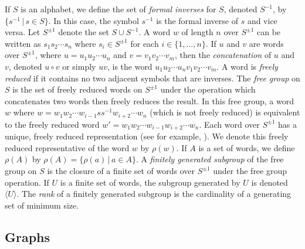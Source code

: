 \documentclass{elsarticlenonatbib}
\newcommand{\gen}[1]{\langle #1 \rangle}
\newcommand{\Spm}{S^{\pm1}}
\begin{document}
If $S$ is an alphabet, we define the set of \emph{formal inverses} for $S$, denoted $S^{-1}$, by $\{ s^{-1} \,|\, s \in S \}$.
In this case, the symbol $s^{-1}$ is the formal inverse of $s$ and vice versa.
Let $\Spm$ denote the set $S \cup S^{-1}$.
A word $w$ of length $n$ over $\Spm$ can be written as $s_1s_2\cdots s_n$ where $s_i \in \Spm$ for each $i \in \{1, \dotsc, n\}$.
If $u$ and $v$ are words over $\Spm$, where $u = u_1 u_2 \dotsb u_n$ and $v = v_1 v_2 \dotsb v_m$, then the \emph{concatenation} of $u$ and $v$, denoted $u \circ v$ or simply $uv$, is the word $u_1 u_2 \cdots u_n v_1 v_2 \cdots v_m$.
A word is \emph{freely reduced} if it contains no two adjacent symbols that are inverses.
The \emph{free group} on $S$ is the set of freely reduced words on $\Spm$ under the operation which concatenates two words then freely reduces the result.
In this free group, a word $w$ where $w = w_1 w_2 \cdots w_{i - 1} s s^{-1} w_{i + 2} \cdots w_n$ (which is not freely reduced) is equivalent to the freely reduced word $w' = w_1 w_2 \cdots w_{i - 1} w_{i + 2} \cdots w_n$.
Each word over $\Spm$ has a unique, freely reduced representation (see for example, \cite[Section~I.1]{ls77}).
We denote this freely reduced representative of the word $w$ by $\rho(w)$.
If $A$ is a set of words, we define $\rho(A)$ by $\rho(A) = \{ \rho(a) \, | \, a \in A\}$.
A \emph{finitely generated subgroup} of the free group on $S$ is the closure of a finite set of words over $\Spm$ under the free group operation.
If $U$ is a finite set of words, the subgroup generated by $U$ is denoted $\gen{U}$.
The \emph{rank} of a finitely generated subgroup is the cardinality of a generating set of minimum size.

\subsection{Graphs}
\end{document}
